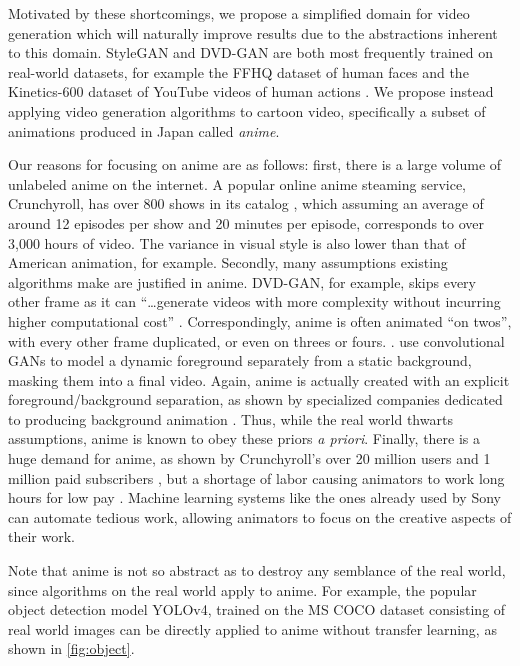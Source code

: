\documentclass[11pt, oneside]{article}
\begin{document}
Motivated by these shortcomings, we propose a simplified domain for
video generation which will naturally improve results due to the
abstractions inherent to this domain. StyleGAN and DVD-GAN are both
most frequently trained on real-world datasets, for example the FFHQ
dataset of human faces and the Kinetics-600 dataset of YouTube videos
of human actions \cite{stylegan, dvdgan}. We propose instead applying
video generation algorithms to cartoon video, specifically a subset
of animations produced in Japan called \emph{anime}.

Our reasons for focusing on anime are as follows: first, there is a large
volume of unlabeled anime on the internet. A popular online anime steaming
service, Crunchyroll, has over 800 shows in its catalog \cite{crunchyroll},
which assuming an average of around 12 episodes per show and 20 minutes per
episode, corresponds to over 3,000 hours of video. The variance in visual
style is also lower than that of American animation, for example. Secondly,
many assumptions existing algorithms make are justified in anime. DVD-GAN,
for example, skips every other frame as it can \enquote{\ldots generate
videos with more complexity without incurring higher computational cost}
\cite{dvdgan}. Correspondingly, anime is often animated \enquote{on twos}, with
every other frame duplicated, or even on threes or fours. \cite{wikipedia}.
\citeauthor*{scene} \cite{scene} use convolutional GANs to model a dynamic
foreground separately from a static background, masking them into a final
video. Again, anime is actually created with an explicit foreground/background
separation, as shown by specialized companies dedicated to producing background
animation \cite{kusanagi}. Thus, while the real world thwarts assumptions,
anime is known to obey these priors \textit{a priori}. Finally, there is a
huge demand for anime, as shown by Crunchyroll's over 20 million users and 1
million paid subscribers \cite{crunchyroll}, but a shortage of labor causing
animators to work long hours for low pay \cite{vox}. Machine learning systems
like the ones already used by Sony \cite{deadline} can automate tedious work,
allowing animators to focus on the creative aspects of their work.

Note that anime is not so abstract as to destroy any semblance of the real
world, since algorithms on the real world apply to anime. For example,
the popular object detection model YOLOv4, trained on the MS COCO dataset
consisting of real world images \cite{yolov4} can be directly applied to
anime without transfer learning, as shown in \autoref{fig:object}.
\end{document}
